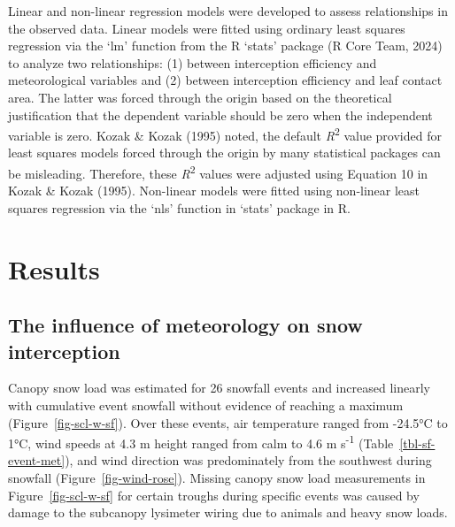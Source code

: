 \documentclass[
  letterpaper,
  DIV=11,
  numbers=noendperiod]{scrartcl}
\begin{document}
Linear and non-linear regression models were developed to assess
relationships in the observed data. Linear models were fitted using
ordinary least squares regression via the `lm' function from the R
`stats' package (R Core Team, 2024) to analyze two relationships: (1)
between interception efficiency and meteorological variables and (2)
between interception efficiency and leaf contact area. The latter was
forced through the origin based on the theoretical justification that
the dependent variable should be zero when the independent variable is
zero. Kozak \& Kozak (1995) noted, the default
\emph{R}\textsuperscript{2} value provided for least squares models
forced through the origin by many statistical packages can be
misleading. Therefore, these \emph{R}\textsuperscript{2} values were
adjusted using Equation 10 in Kozak \& Kozak (1995). Non-linear models
were fitted using non-linear least squares regression via the `nls'
function in `stats' package in R.

\section{Results}\label{results}

\subsection{The influence of meteorology on snow
interception}\label{the-influence-of-meteorology-on-snow-interception}

Canopy snow load was estimated for 26 snowfall events and increased
linearly with cumulative event snowfall without evidence of reaching a
maximum (Figure~\ref{fig-scl-w-sf}). Over these events, air temperature
ranged from -24.5°C to 1°C, wind speeds at 4.3 m height ranged from calm
to 4.6 m s\textsuperscript{-1} (Table~\ref{tbl-sf-event-met}), and wind
direction was predominately from the southwest during snowfall
(Figure~\ref{fig-wind-rose}). Missing canopy snow load measurements in
Figure~\ref{fig-scl-w-sf} for certain troughs during specific events was
caused by damage to the subcanopy lysimeter wiring due to animals and
heavy snow loads.
\end{document}
